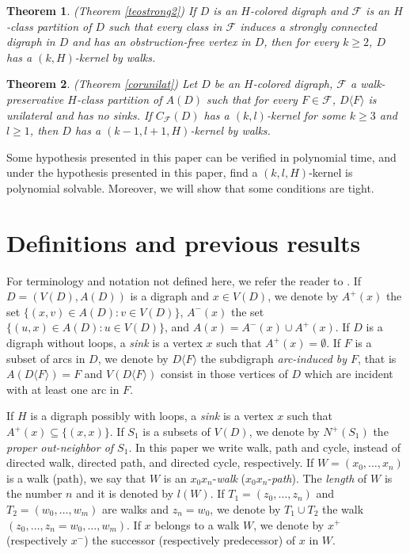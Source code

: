 \documentclass[10pt,a4paper]{article}
\newtheorem{theorem}{Theorem}[section]
\begin{document}
\begin{theorem}(Theorem \ref{teostrong2})
If $D$ is an $H$-colored digraph and $\mathscr{F}$ is an $H$-class partition of $D$ such that every class in $\mathscr{F}$ induces a strongly connected digraph in $D$ and has an obstruction-free vertex in $D$, then for every $k \geq 2$, $D$ has a $(k,H)$-kernel by walks.
\end{theorem}

\begin{theorem}(Theorem \ref{corunilat})
Let $D$ be an $H$-colored digraph, $\mathscr{F}$ a walk-preservative $H$-class partition of $A(D)$ such that for every $F \in \mathscr{F}$, $D\langle F \rangle$ is unilateral and has no sinks. If  $C_{\mathscr{F}}(D)$ has a $(k,l)$-kernel for some $k \geq 3$ and $l \geq 1$, then $D$ has a $(k-1,l+1,H)$-kernel by walks.
\end{theorem}

Some hypothesis presented in this paper can be verified in polynomial time, and under the hypothesis presented in this paper, find a $(k,l,H)$-kernel is polynomial solvable. Moreover, we will show that some conditions are tight. 

\section{Definitions and previous results}

For terminology and notation not defined here, we refer the reader to  \cite{1}.  If $D =(V(D), A(D))$ is a digraph and $x\in V(D)$, we denote by $A^{+}(x)$ the set $\{ (x,v) \in A(D): v \in V(D) \}$, $A^{-}(x)$ the set $\{ (u,x) \in A(D) : u \in V(D) \}$, and $A(x)=A^{-}(x) \cup A^{+}(x)$. If $D$ is a digraph without loops, a \emph{sink} is a vertex $x$ such that $A^{+}(x)=\emptyset$.
If $F$ is a subset of arcs in $D$, we denote by $D\langle F \rangle$ the subdigraph \textit{arc-induced by $F$}, that is $A(D\langle F \rangle) = F$ and $V(D\langle F \rangle)$ consist in those vertices of $D$ which are incident with at least one arc in $F$.

If $H$ is a digraph possibly with loops, a \emph{sink} is a vertex $x$ such that $A^{+}(x) \subseteq \{(x,x)\}$.  If  $S_1$ is a subsets of $V(D)$, we denote by $N^{+}(S_{1})$ the \emph{proper out-neighbor of $S_{1}$}.  In this paper we write walk, path and cycle, instead of directed walk, directed path, and directed cycle, respectively.
 If $W=(x_{0}, \ldots , x_{n})$ is a walk (path), we say that $W$ is an $x_0x_n$-\emph{walk} ($x_0x_n$-\emph{path}). The \emph{length} of $W$ is the number $n$ and it is denoted by $l(W)$.
If $T_{1}=(z_{0}, \ldots , z_{n})$ and $T_{2}=(w_{0}, \ldots , w_{m})$ are walks and $z_{n}=w_{0}$, we denote by $T_{1} \cup T_{2}$ the walk $(z_{0}, \ldots , z_{n} = w_{0}, \ldots , w_{m})$. 
If $x$ belongs to a walk $W$, we denote by $x^{+}$ (respectively $x^{-}$) the successor (respectively predecessor) of $x$ in $W$.
\end{document}
